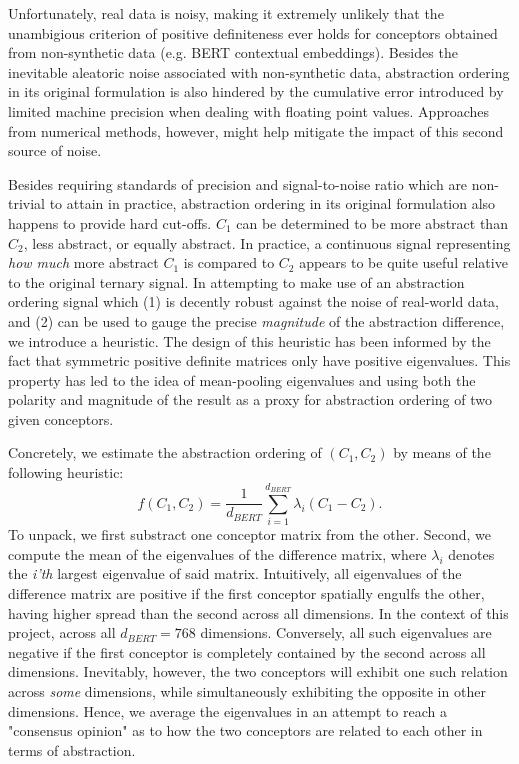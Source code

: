 Unfortunately, real data is noisy, making it extremely unlikely that the unambigious criterion of positive definiteness ever holds for conceptors obtained from non-synthetic data (e.g. BERT contextual embeddings). Besides the inevitable aleatoric noise associated with non-synthetic data, abstraction ordering in its original formulation is also hindered by the cumulative error introduced by limited machine precision when dealing with floating point values. Approaches from numerical methods, however, might help mitigate the impact of this second source of noise.

Besides requiring standards of precision and signal-to-noise ratio which are non-trivial to attain in practice, abstraction ordering in its original formulation also happens to provide hard cut-offs. $C_1$ can be determined to be more abstract than $C_2$, less abstract, or equally abstract. In practice, a continuous signal representing \textit{how much} more abstract $C_1$ is compared to $C_2$ appears to be quite useful relative to the original ternary signal. In attempting to make use of an abstraction ordering signal which (1) is decently robust against the noise of real-world data, and (2) can be used to gauge the precise \textit{magnitude} of the abstraction difference, we introduce a heuristic. The design of this heuristic has been informed by the fact that symmetric positive definite matrices only have positive eigenvalues. This property has led to the idea of mean-pooling eigenvalues and using both the polarity and magnitude of the result as a proxy for abstraction ordering of two given conceptors.

Concretely, we estimate the abstraction ordering of $(C_1, C_2)$ by means of the following heuristic:$$f(C_1, C_2) = \frac{1}{d_{BERT}} \sum\limits_{i=1}^{d_{BERT}} \lambda_i(C_1 - C_2).$$ To unpack, we first substract one conceptor matrix from the other. Second, we compute the mean of the eigenvalues of the difference matrix, where $\lambda_i$ denotes the \textit{i'th} largest eigenvalue of said matrix. Intuitively, all eigenvalues of the difference matrix are positive if the first conceptor spatially engulfs the other, having higher spread than the second across all dimensions. In the context of this project, across all $d_{BERT} = 768$ dimensions. Conversely, all such eigenvalues are negative if the first conceptor is completely contained by the second across all dimensions. Inevitably, however, the two conceptors will exhibit one such relation across \textit{some} dimensions, while simultaneously exhibiting the opposite in other dimensions. Hence, we average the eigenvalues in an attempt to reach a "consensus opinion" as to how the two conceptors are related to each other in terms of abstraction.


